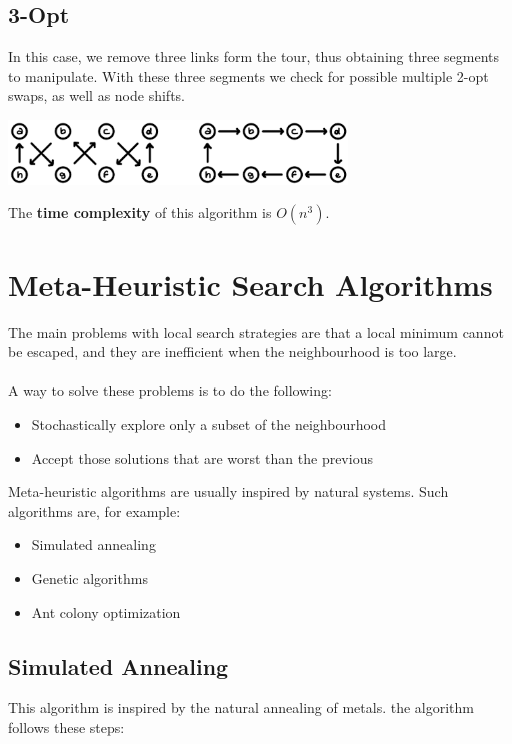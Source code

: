 \documentclass{article}
\begin{document}
\subsection{3-Opt}
In this case, we remove three links form the tour, thus obtaining three segments to manipulate. With these three segments we check for possible multiple 2-opt swaps, as well as node shifts. \\

\begin{center}
	\includegraphics[width=9cm]{3opt.png}
\end{center}
\vspace{.3cm}
The \textbf{time complexity} of this algorithm is $O(n^3)$.

\section{Meta-Heuristic Search Algorithms}
The main problems with local search strategies are that a local minimum cannot be escaped, and they are inefficient when the neighbourhood is too large. \\ \\
A way to solve these problems is to do the following:

\begin{itemize}
	\item Stochastically explore only a subset of the neighbourhood
	\item Accept those solutions that are worst than the previous
\end{itemize}
Meta-heuristic algorithms are usually inspired by natural systems. Such algorithms are, for example:

\begin{itemize}
	\item Simulated annealing
	\item Genetic algorithms
	\item Ant colony optimization
\end{itemize}

\subsection{Simulated Annealing}
This algorithm is inspired by the natural annealing of metals. the algorithm follows these steps:
\end{document}
